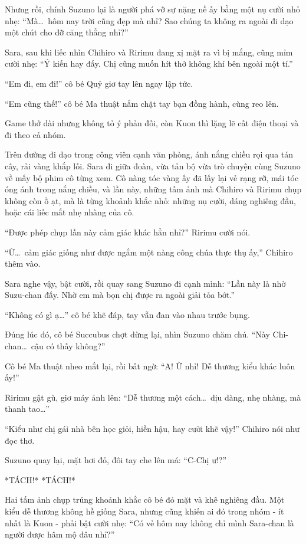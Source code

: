 \documentclass[../main.tex]{subfiles}
\begin{document}
Nhưng rồi, chính Suzuno lại là người phá vỡ sự nặng nề ấy bằng một nụ cười nhỏ nhẹ: ``Mà\dots\ hôm nay trời cũng đẹp mà nhỉ? Sao chúng ta không ra ngoài đi dạo một chút cho đỡ căng thẳng nhỉ?''

Sara, sau khi liếc nhìn Chihiro và Ririmu đang xị mặt ra vì bị mắng, cũng mỉm cười nhẹ: ``Ý kiến hay đấy. Chị cũng muốn hít thở không khí bên ngoài một tí.''

``Em đi, em đi!'' cô bé Quỷ giơ tay lên ngay lập tức.

``Em cũng thế!'' cô bé Ma thuật nắm chặt tay bạn đồng hành, cùng reo lên.

Game thở dài nhưng không tỏ ý phản đối, còn Kuon thì lặng lẽ cất điện thoại và đi theo cả nhóm.

\ct

Trên đường đi dạo trong công viên cạnh văn phòng, ánh nắng chiều rọi qua tán cây, rải vàng khắp lối. Sara đi giữa đoàn, vừa tản bộ vừa trò chuyện cùng Suzuno về mấy bộ phim cô từng xem. Cô nàng tóc vàng ấy đã lấy lại vẻ rạng rỡ, mái tóc óng ánh trong nắng chiều, và lần này, những tấm ảnh mà Chihiro và Ririmu chụp không còn ồ ạt, mà là từng khoảnh khắc nhỏ: những nụ cười, dáng nghiêng đầu, hoặc cái liếc mắt nhẹ nhàng của cô.

``Được phép chụp lần này cảm giác khác hẳn nhỉ?'' Ririmu cười nói.

``Ừ\dots\ cảm giác giống như được ngắm một nàng công chúa thực thụ ấy,'' Chihiro thêm vào.

Sara nghe vậy, bật cười, rồi quay sang Suzuno đi cạnh mình: ``Lần này là nhờ Suzu-chan đấy. Nhờ em mà bọn chị được ra ngoài giải tỏa bớt.''

``Không có gì ạ\dots'' cô bé khẽ đáp, tay vẫn đan vào nhau trước bụng.

Đúng lúc đó, cô bé Succubus chợt dừng lại, nhìn Suzuno chăm chú. ``Này Chi-chan\dots\ cậu có thấy không?''

Cô bé Ma thuật nheo mắt lại, rồi bất ngờ: ``A! Ừ nhỉ! Dễ thương kiểu khác luôn ấy!''

Ririmu gật gù, giơ máy ảnh lên: ``Dễ thương một cách\dots\ dịu dàng, nhẹ nhàng, mà thanh tao\dots''

``Kiểu như chị gái nhà bên học giỏi, hiền hậu, hay cười khẽ vậy!'' Chihiro nói như đọc thơ.

Suzuno quay lại, mặt hơi đỏ, đôi tay che lên má: ``C-Chị ư!?''

*TÁCH!* *TÁCH!*

Hai tấm ảnh chụp trúng khoảnh khắc cô bé đỏ mặt và khẽ nghiêng đầu. Một kiểu dễ thương không hề giống Sara, nhưng cũng khiến ai đó trong nhóm - ít nhất là Kuon - phải bật cười nhẹ: ``Có vẻ hôm nay không chỉ mình Sara-chan là người được hâm mộ đâu nhỉ?''
\end{document}
